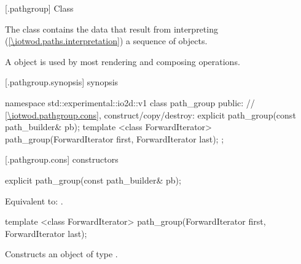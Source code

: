  [\iotwod.pathgroup] {Class }

\pnum
{}%
The class  contains the data that result from interpreting (\ref{\iotwod.paths.interpretation}) a sequence of  objects. %

\pnum
A  object is used by most rendering and composing operations.

%
%
%
%
 [\iotwod.pathgroup.synopsis] { synopsis}

\begin{codeblock}
namespace std::experimental::io2d::v1 {
  class path_group {
    public:
    // \ref{\iotwod.pathgroup.cons}, construct/copy/destroy:
    explicit path_group(const path_builder& pb);
    template <class ForwardIterator>
    path_group(ForwardIterator first, ForwardIterator last);
  };
}
\end{codeblock}

 [\iotwod.pathgroup.cons] { constructors}

%
\begin{itemdecl}
explicit path_group(const path_builder& pb);
\end{itemdecl}
\begin{itemdescr}
\pnum
\effects
Equivalent to: .	
\end{itemdescr}

%
\begin{itemdecl}
template <class ForwardIterator>
path_group(ForwardIterator first, ForwardIterator last);
\end{itemdecl}
\begin{itemdescr}
\pnum
\effects
Constructs an object of type .
%
%	
\end{itemdescr}
